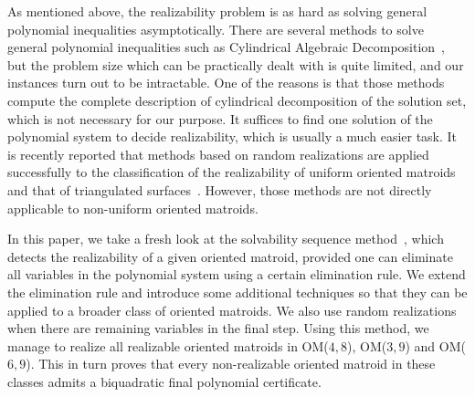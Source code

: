 \documentclass{article}
\begin{document}
As mentioned above, the realizability problem is as hard as solving general polynomial inequalities asymptotically.
There are several methods to solve general polynomial inequalities such as Cylindrical Algebraic Decomposition~\cite{C75},
but the problem size which can be practically dealt with 
is quite limited, and our instances turn out to be intractable.
One of the reasons is that those methods compute the complete description 
of cylindrical decomposition of the solution set, which is not necessary for our purpose.
It suffices to find one solution of the polynomial system to decide realizability,
which is usually a much easier task.
It is recently reported that methods based on random realizations are applied successfully to
the classification of the realizability of
uniform oriented matroids~\cite{AAK02,AK06} and that of triangulated surfaces~\cite{L08}.
However, those methods are not directly applicable to non-uniform oriented matroids.

In this paper,  we take a fresh look at the solvability sequence method~\cite{BS86}, which detects the realizability of a given oriented matroid,
provided one can eliminate all variables in the polynomial system using a certain elimination rule.
We extend the elimination rule and introduce some additional techniques so that
they can be applied to a broader class of oriented matroids.  We also
use random realizations when there are remaining variables in the final step.
Using this method, we manage to realize all realizable oriented matroids in OM($4,8$), OM($3,9$) and OM($6,9$).
This in turn proves that every non-realizable oriented matroid in these classes admits a biquadratic final polynomial certificate.
\end{document}
